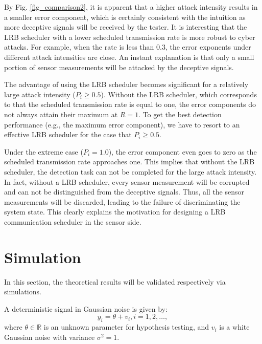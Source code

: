 \documentclass[journal]{IEEEtran}
\begin{document}
By Fig. \ref{fig_comparison2}, it is apparent that a higher attack intensity results in a smaller error component, which is certainly consistent with the intuition as more deceptive signals will be received by the tester. It is interesting that the LRB scheduler with a lower scheduled transmission rate is more robust to cyber attacks. For example, when the rate is less than 0.3, the error exponents under different attack intensities are close. An instant explanation is that only a small portion of sensor measurements will be attacked by the deceptive signals.

The advantage of using the LRB scheduler becomes significant for a relatively large attack intensity ($P_i \ge 0.5$). Without the LRB scheduler, which corresponds to that the scheduled transmission rate is equal to one, the error components do not always attain their maximum at $R=1$. To get the best detection performance (e.g., the maximum error component), we have to resort to an effective LRB scheduler for the case that $P_i \ge 0.5$.



Under the extreme case ($P_i=1.0$), the error component even goes to zero as the scheduled transmission rate approaches one.  This implies that without  the LRB scheduler, the detection task can not be completed for the large attack intensity. In fact, without a LRB scheduler, every sensor measurement will be corrupted and can not be distinguished from the deceptive signals. Thus, all the sensor measurements will be discarded, leading to the failure of discriminating the system state.  This clearly explains the motivation for designing a LRB communication scheduler in the sensor side.


























\section{Simulation}
In this section, the theoretical results will be validated respectively via simulations.

A deterministic signal in Gaussian noise is given by:
\begin{equation}
y_{i}=\theta+v_{i},i=1,2,\ldots,
\end{equation}
where $\theta\in \mathbb{R}$ is an unknown parameter for hypothesis testing, and $v_{i}$ is a white Gaussian noise with variance $\sigma^{2}=1$.
\end{document}
